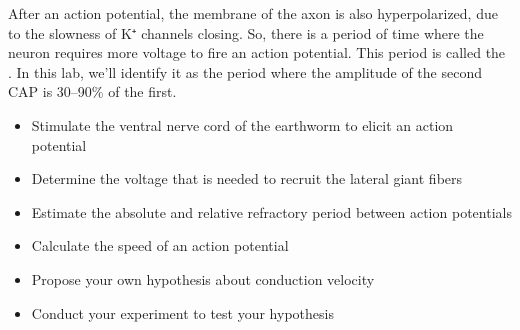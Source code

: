 \documentclass[letterpaper,10pt,english]{jupyterBook}
\begin{document}
\sphinxAtStartPar
After an action potential, the membrane of the axon is also hyperpolarized, due to the slowness of K⁺ channels closing. So, there is a period of time where the neuron requires more voltage to fire an action potential. This period is called the . In this lab, we’ll identify it as the period where the amplitude of the second CAP is 30–90\% of the first.

\sphinxAtStartPar
{}
\begin{itemize}
\item {} 
\sphinxAtStartPar
Stimulate the ventral nerve cord of the earthworm to elicit an action potential

\item {} 
\sphinxAtStartPar
Determine the voltage that is needed to recruit the lateral giant fibers

\item {} 
\sphinxAtStartPar
Estimate the absolute and relative refractory period between action potentials

\item {} 
\sphinxAtStartPar
Calculate the speed of an action potential

\item {} 
\sphinxAtStartPar
Propose your own hypothesis about conduction velocity

\item {} 
\sphinxAtStartPar
Conduct your experiment to test your hypothesis

\end{itemize}
\end{document}
